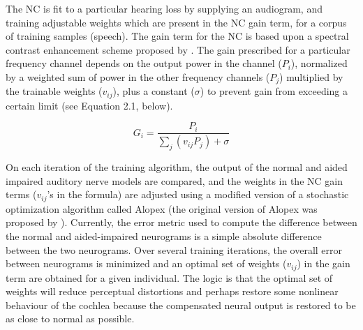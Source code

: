 The NC is fit to a particular hearing loss by supplying an audiogram, and training adjustable weights which are present in the NC gain term, for a corpus of training samples (speech).  The gain term for the NC is based upon a spectral contrast enhancement scheme proposed by .  The gain prescribed for a particular frequency channel depends on the output power in the channel ($P_i$), normalized by a weighted sum of power in the other frequency channels ($P_j$) multiplied by the trainable weights ($v_{ij}$), plus a constant ($\sigma$) to prevent gain from exceeding a certain limit (see Equation 2.1, below).

\begin{equation}
G_i = \frac{P_i}{\sum_{j} (v_{ij} P_j) + \sigma}
\end{equation}

On each iteration of the training algorithm, the output of the normal and aided impaired auditory nerve models are compared, and the weights in the NC gain terms ($v_{ij}$'s in the formula) are adjusted using a modified version of a stochastic optimization algorithm called Alopex (the original version of Alopex was proposed by ).  Currently, the error metric used to compute the difference between the normal and aided-impaired neurograms is a simple absolute difference between the two neurograms.  Over several training iterations, the overall error between neurograms is minimized and an optimal set of weights ($v_{ij}$) in the gain term are obtained for a given individual.  The logic is that the optimal set of weights will reduce perceptual distortions and perhaps restore some nonlinear behaviour of the cochlea because the compensated neural output is restored to be as close to normal as possible. 